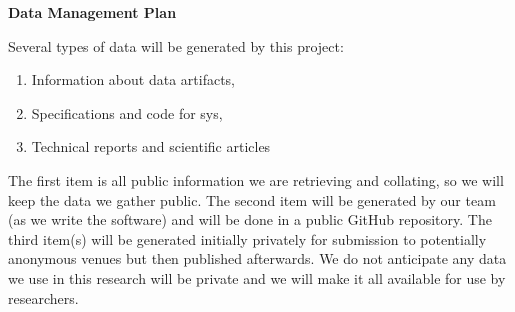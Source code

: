 \begin{center}
{\large \bf \TITLE}
\end{center}

\begin{center}
    {\bf Data Management Plan}
\end{center}






 Several types of data will be generated by this project:

\begin{enumerate}
\item Information about data artifacts,
\item Specifications and code for sys,
\item Technical reports and scientific articles
\end{enumerate}

The first item is all public information we are retrieving and collating, so
we will keep the data we gather public.  The second item will be generated
by our team (as we write the software) and will be done in a public GitHub
repository.  The third item(s) will be generated initially privately for
submission to potentially anonymous venues but then published afterwards.  We
do not anticipate any data we use in this research will be private and we
will make it all available for use by researchers.


%


